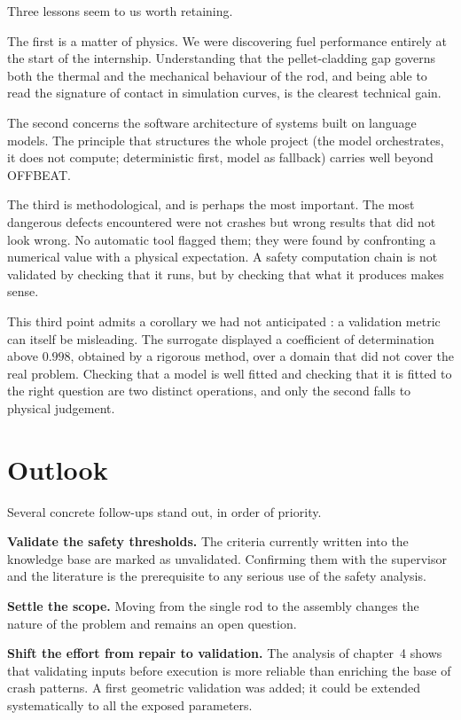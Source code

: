 Three lessons seem to us worth retaining.

The first is a matter of physics. We were discovering fuel performance entirely at
the start of the internship. Understanding that the pellet-cladding gap governs
both the thermal and the mechanical behaviour of the rod, and being able to read
the signature of contact in simulation curves, is the clearest technical gain.

The second concerns the software architecture of systems built on language
models. The principle that structures the whole project (the model orchestrates,
it does not compute; deterministic first, model as fallback) carries well beyond
OFFBEAT.

The third is methodological, and is perhaps the most important. The most
dangerous defects encountered were not crashes but wrong results that did not
look wrong. No automatic tool flagged them; they were found by confronting a
numerical value with a physical expectation. A safety computation chain is not
validated by checking that it runs, but by checking that what it produces makes
sense.

This third point admits a corollary we had not anticipated : a validation metric
can itself be misleading. The surrogate displayed a coefficient of determination
above $0.998$, obtained by a rigorous method, over a domain that did not cover
the real problem. Checking that a model is well fitted and checking that it is
fitted to the right question are two distinct operations, and only the second
falls to physical judgement.

\section*{Outlook}

Several concrete follow-ups stand out, in order of priority.

\textbf{Validate the safety thresholds.} The criteria currently written into the
knowledge base are marked as unvalidated. Confirming them with the supervisor
and the literature is the prerequisite to any serious use of the safety analysis.

\textbf{Settle the scope.} Moving from the single rod to the assembly changes the
nature of the problem and remains an open question.

\textbf{Shift the effort from repair to validation.} The analysis of chapter~4
shows that validating inputs before execution is more reliable than enriching the
base of crash patterns. A first geometric validation was added; it could be
extended systematically to all the exposed parameters.


